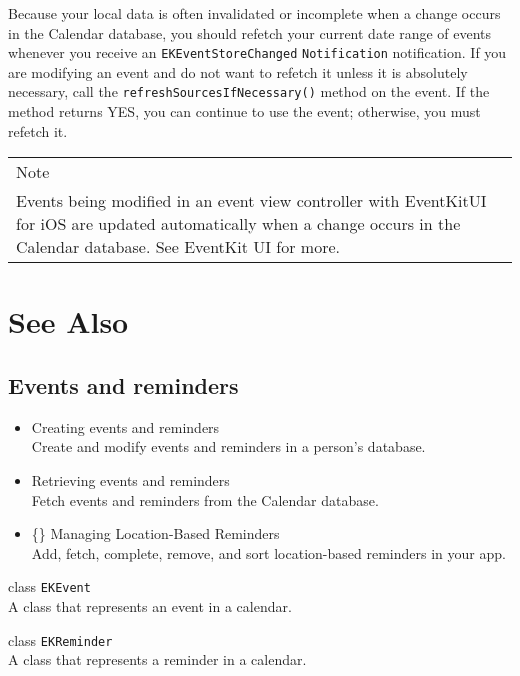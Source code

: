 \documentclass{article}
\begin{document}
Because your local data is often invalidated or incomplete when a change occurs in the Calendar database, you
should refetch your current date range of events whenever you receive an \texttt{EKEventStoreChanged}
\texttt{Notification} notification. If you are modifying an event and do not want to refetch it unless it is absolutely
necessary, call the \texttt{refreshSourcesIfNecessary()} method on the event. If the method returns YES, you can
continue to use the event; otherwise, you must refetch it.

\begin{tabular}{|p{13cm}|}
    \hline
    Note \\
    Events being modified in an event view controller with EventKitUI for iOS are updated automatically when a
change occurs in the Calendar database. See EventKit UI for more. \\
    \hline
\end{tabular}

\section*{See Also}

\subsection*{Events and reminders}

\begin{itemize}
    \item Creating events and reminders \\
Create and modify events and reminders in a person's database.
    \item Retrieving events and reminders \\
Fetch events and reminders from the Calendar database.
    \item \{\} Managing Location-Based Reminders \\
Add, fetch, complete, remove, and sort location-based reminders in your app.
\end{itemize}

\noindent class \texttt{EKEvent} \\
A class that represents an event in a calendar.

\noindent class \texttt{EKReminder} \\
A class that represents a reminder in a calendar.

\newpage
\end{document}
